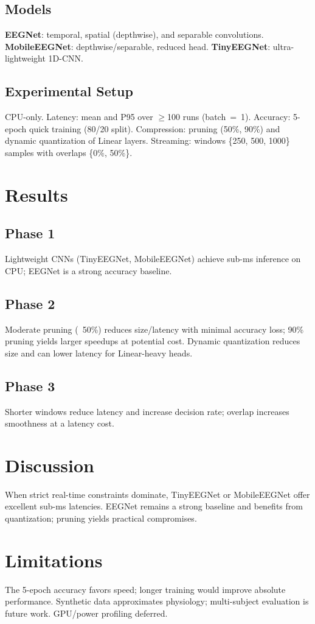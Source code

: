 ﻿\documentclass[conference]{IEEEtran}
\begin{document}
\subsection{Models}
\textbf{EEGNet}: temporal, spatial (depthwise), and separable convolutions.
\textbf{MobileEEGNet}: depthwise/separable, reduced head.
\textbf{TinyEEGNet}: ultra-lightweight 1D-CNN.
\subsection{Experimental Setup}
CPU-only. Latency: mean and P95 over $\ge$100 runs (batch~=~1). Accuracy: 5-epoch quick training (80/20 split). Compression: pruning (50\%, 90\%) and dynamic quantization of Linear layers. Streaming: windows \{250, 500, 1000\} samples with overlaps \{0\%, 50\%\}.
\section{Results}
\subsection{Phase 1}
Lightweight CNNs (TinyEEGNet, MobileEEGNet) achieve sub-ms inference on CPU; EEGNet is a strong accuracy baseline.
\subsection{Phase 2}
Moderate pruning (~50\%) reduces size/latency with minimal accuracy loss; 90\% pruning yields larger speedups at potential cost. Dynamic quantization reduces size and can lower latency for Linear-heavy heads.
\subsection{Phase 3}
Shorter windows reduce latency and increase decision rate; overlap increases smoothness at a latency cost.
\section{Discussion}
When strict real-time constraints dominate, TinyEEGNet or MobileEEGNet offer excellent sub-ms latencies. EEGNet remains a strong baseline and benefits from quantization; pruning yields practical compromises.
\section{Limitations}
The 5-epoch accuracy favors speed; longer training would improve absolute performance. Synthetic data approximates physiology; multi-subject evaluation is future work. GPU/power profiling deferred.
\end{document}
